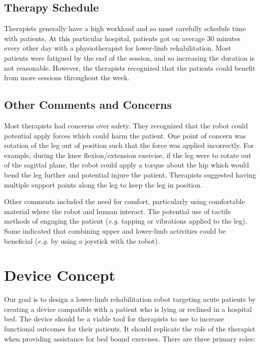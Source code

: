 \documentclass[12pt]{report}
\begin{document}
	\subsection{Therapy Schedule}
	
	Therapists generally have a high workload and so must carefully schedule time with patients. At this particular hospital, patients got on average 30 minutes every other day with a physiotherapist for lower-limb rehabilitation. Most patients were fatigued by the end of the session, and so increasing the duration is not reasonable. However, the therapists recognized that the patients could benefit from more sessions throughout the week. 
	
	\subsection{Other Comments and Concerns}
	
	Most therapists had concerns over safety. They recognized that the robot could potential apply forces which could harm the patient. One point of concern was rotation of the leg out of position such that the force was applied incorrectly. For example, during the knee flexion/extension exercise, if the leg were to rotate out of the sagittal plane, the robot could apply a torque about the hip which would bend the leg further and potential injure the patient. Therapists suggested having multiple support points along the leg to keep the leg in position. 
	
	Other comments included the need for comfort, particularly using comfortable material where the robot and human interact. The potential use of tactile methods of engaging the patient (\textit{e.g.} tapping or vibrations applied to the leg). Some indicated that combining upper and lower-limb activities could be beneficial (\textit{e.g.} by using a joystick with the robot). 
	
	
\section{Device Concept} 

Our goal is to design a lower-limb rehabilitation robot targeting acute patients by creating a device compatible with a patient who is lying or reclined in a hospital bed. The device should be a viable tool for therapists to use to increase functional outcomes for their patients. It should replicate the role of the therapist when providing assistance for bed bound exercises. There are three primary roles:
\end{document}

